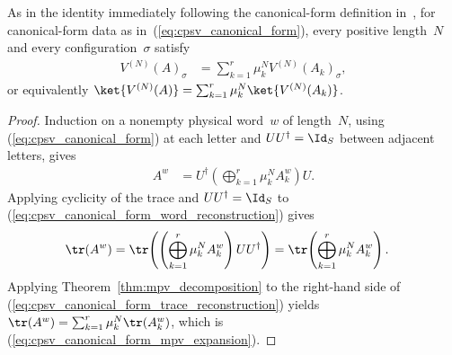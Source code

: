 \begin{lemma}
    \label{thm:cpsv_canonical_form_mpv_expansion}
    \leanok
    As in the identity immediately following the canonical-form definition
    in~\cite[Section~2.3]{Cirac2016MPDO_arXiv}, for canonical-form data as
    in~(\ref{eq:cpsv_canonical_form}), every positive length~$N$ and every
    configuration~$\sigma$ satisfy
    \begin{align}
        V^{(N)}(A)_\sigma
         & =\sum_{k=1}^{r}\mu_k^N V^{(N)}(A_k)_\sigma,
        \label{eq:cpsv_canonical_form_mpv_expansion}
    \end{align}
    or equivalently
    $\ket{V^{(N)}(A)}=\sum_{k=1}^{r}\mu_k^N\ket{V^{(N)}(A_k)}$.
\end{lemma}

\begin{proof}\leanok
    Induction on a nonempty physical word~$w$ of length~$N$, using
    (\ref{eq:cpsv_canonical_form}) at each letter and
    $UU^\dagger=\Id_S$ between adjacent letters, gives
    \begin{align}
        A^w
         & =U^\dagger
        \left(\bigoplus_{k=1}^{r}\mu_k^N A_k^w\right)U.
        \label{eq:cpsv_canonical_form_word_reconstruction}
    \end{align}
    Applying cyclicity of the trace and $UU^\dagger=\Id_S$ to
    (\ref{eq:cpsv_canonical_form_word_reconstruction}) gives
    \begin{align}
        \tr(A^w)
         & =\tr\!\left(
        \left(\bigoplus_{k=1}^{r}\mu_k^N A_k^w\right)UU^\dagger
        \right)
        =\tr\!\left(\bigoplus_{k=1}^{r}\mu_k^N A_k^w\right).
        \label{eq:cpsv_canonical_form_trace_reconstruction}
    \end{align}
    Applying Theorem~\ref{thm:mpv_decomposition} to the right-hand side of
    (\ref{eq:cpsv_canonical_form_trace_reconstruction}) yields
    $\tr(A^w)=\sum_{k=1}^{r}\mu_k^N\tr(A_k^w)$, which is
    (\ref{eq:cpsv_canonical_form_mpv_expansion}).
\end{proof}

